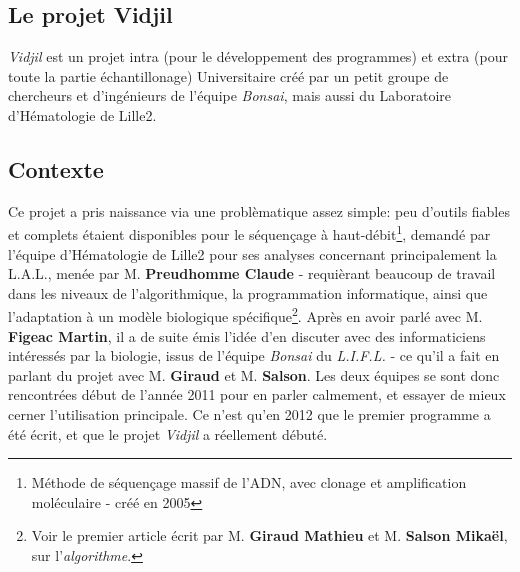 \documentclass[12pt]{report}
\begin{document}
\begin{spacing}{1.2}
\section{Le projet Vidjil}

\textit{Vidjil} est un projet intra (pour le développement des programmes) et extra (pour toute la partie échantillonage) Universitaire créé par un petit groupe de chercheurs et d'ingénieurs de l'équipe \textit{Bonsai}, mais aussi du Laboratoire d'Hématologie de Lille2.
\subsection{Contexte}
Ce projet a pris naissance via une problèmatique assez simple: peu d'outils fiables et complets étaient disponibles pour le séquençage à haut-débit\footnote{Méthode de séquençage massif de l'ADN, avec clonage et amplification moléculaire - créé en 2005}, demandé par l'équipe d'Hématologie de Lille2 pour ses analyses concernant principalement la L.A.L., menée par M. \textbf{Preudhomme Claude} - requièrant beaucoup de travail dans les niveaux de l'algorithmique, la programmation informatique, ainsi que l'adaptation à un modèle biologique spécifique\footnote{Voir le premier article écrit par M. \textbf{Giraud Mathieu} et M. \textbf{Salson Mikaël}, sur l'\textit{algorithme}.}.
\newline
Après en avoir parlé avec M. \textbf{Figeac Martin}, il a de suite émis l'idée d'en discuter avec des informaticiens intéressés par la biologie, issus de l'équipe \textit{Bonsai} du \textit{L.I.F.L.} - ce qu'il a fait en parlant du projet avec M. \textbf{Giraud} et M. \textbf{Salson}.
\newline
Les deux équipes se sont donc rencontrées début de l'année 2011 pour en parler calmement, et essayer de mieux cerner l'utilisation principale. Ce n'est qu'en 2012 que le premier programme a été écrit, et que le projet \textit{Vidjil} a réellement débuté.


\end{spacing}
\end{document}
